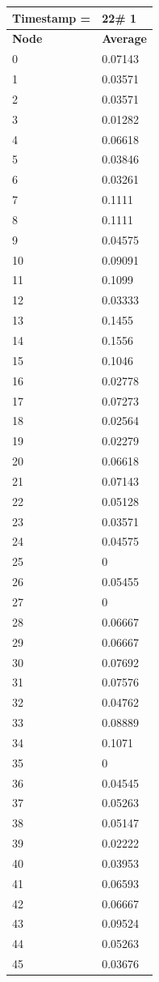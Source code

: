 \begin{tabular}{|l||l|}
\hline
\textbf{Timestamp =} & \textbf{22}\# 1\\\hline
	\textbf{Node} & \textbf{Average} \\ \hline
\hline
	0 & 0.07143 \\ \hline
	1 & 0.03571 \\ \hline
	2 & 0.03571 \\ \hline
	3 & 0.01282 \\ \hline
	4 & 0.06618 \\ \hline
	5 & 0.03846 \\ \hline
	6 & 0.03261 \\ \hline
	7 & 0.1111 \\ \hline
	8 & 0.1111 \\ \hline
	9 & 0.04575 \\ \hline
	10 & 0.09091 \\ \hline
	11 & 0.1099 \\ \hline
	12 & 0.03333 \\ \hline
	13 & 0.1455 \\ \hline
	14 & 0.1556 \\ \hline
	15 & 0.1046 \\ \hline
	16 & 0.02778 \\ \hline
	17 & 0.07273 \\ \hline
	18 & 0.02564 \\ \hline
	19 & 0.02279 \\ \hline
	20 & 0.06618 \\ \hline
	21 & 0.07143 \\ \hline
	22 & 0.05128 \\ \hline
	23 & 0.03571 \\ \hline
	24 & 0.04575 \\ \hline
	25 & 0 \\ \hline
	26 & 0.05455 \\ \hline
	27 & 0 \\ \hline
	28 & 0.06667 \\ \hline
	29 & 0.06667 \\ \hline
	30 & 0.07692 \\ \hline
	31 & 0.07576 \\ \hline
	32 & 0.04762 \\ \hline
	33 & 0.08889 \\ \hline
	34 & 0.1071 \\ \hline
	35 & 0 \\ \hline
	36 & 0.04545 \\ \hline
	37 & 0.05263 \\ \hline
	38 & 0.05147 \\ \hline
	39 & 0.02222 \\ \hline
	40 & 0.03953 \\ \hline
	41 & 0.06593 \\ \hline
	42 & 0.06667 \\ \hline
	43 & 0.09524 \\ \hline
	44 & 0.05263 \\ \hline
	45 & 0.03676 \\ \hline
\end{tabular}
